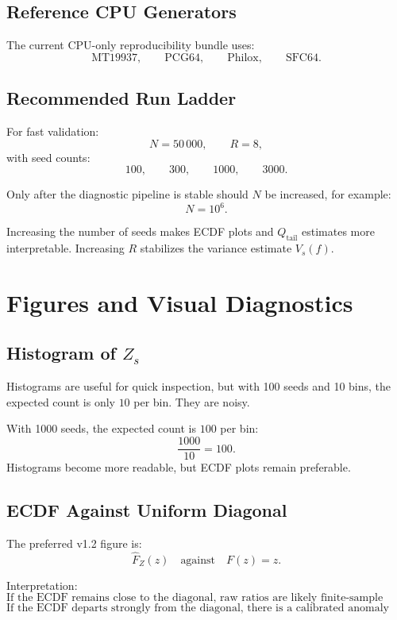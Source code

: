 \documentclass[11pt,a4paper]{article}
\newcommand{\qtail}{Q_{\mathrm{tail}}}
\begin{document}
\subsection{Reference CPU Generators}

The current CPU-only reproducibility bundle uses:
\[
\text{MT19937},\qquad
\text{PCG64},\qquad
\text{Philox},\qquad
\text{SFC64}.
\]

\subsection{Recommended Run Ladder}

For fast validation:
\[
N=50\,000,\qquad R=8,
\]
with seed counts:
\[
100,\qquad 300,\qquad 1000,\qquad 3000.
\]

Only after the diagnostic pipeline is stable should \(N\) be increased, for example:
\[
N=10^6.
\]

Increasing the number of seeds makes ECDF plots and \(\qtail\) estimates more interpretable. Increasing \(R\) stabilizes the variance estimate \(V_s(f)\).

\section{Figures and Visual Diagnostics}

\subsection{Histogram of \(Z_s\)}

Histograms are useful for quick inspection, but with 100 seeds and 10 bins, the expected count is only \(10\) per bin. They are noisy.

With 1000 seeds, the expected count is \(100\) per bin:
\[
\frac{1000}{10}=100.
\]
Histograms become more readable, but ECDF plots remain preferable.

\subsection{ECDF Against Uniform Diagonal}

The preferred v1.2 figure is:
\[
\hat F_Z(z)
\quad\text{against}\quad
F(z)=z.
\]

Interpretation:
\[
\boxed{
\text{If the ECDF remains close to the diagonal, raw ratios are likely finite-sample noise.}
}
\]
\[
\boxed{
\text{If the ECDF departs strongly from the diagonal, there is a calibrated anomaly signal.}
}
\]
\end{document}
